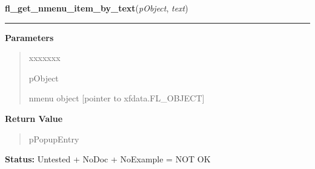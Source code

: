 \hspace{.8\funcindent}\begin{boxedminipage}{\funcwidth}

    \raggedright \textbf{fl\_get\_nmenu\_item\_by\_text}(\textit{pObject}, \textit{text})

    \vspace{-1.5ex}

    \rule{\textwidth}{0.5\fboxrule}
\setlength{\parskip}{2ex}
\setlength{\parskip}{1ex}
      \textbf{Parameters}
      \vspace{-1ex}

      \begin{quote}
        \begin{Ventry}{xxxxxxx}

          \item[pObject]

          nmenu object [pointer to xfdata.FL\_OBJECT]

        \end{Ventry}

      \end{quote}

      \textbf{Return Value}
    \vspace{-1ex}

      \begin{quote}
      pPopupEntry

      \end{quote}

\textbf{Status:} Untested + NoDoc + NoExample = NOT OK



    \end{boxedminipage}

    \label{xformslib:library:fl_set_nmenu_policy}

    \vspace{0.5ex}

